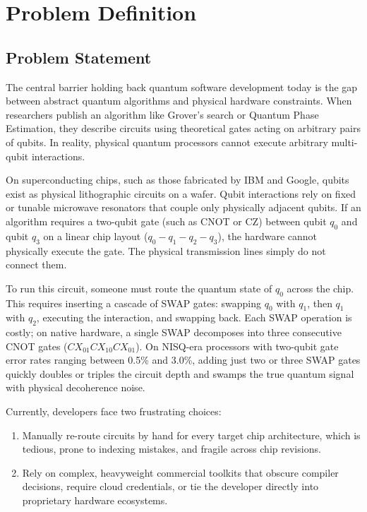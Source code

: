 
\chapter{Problem Definition}


\section{Problem Statement}

The central barrier holding back quantum software development today is the gap between abstract quantum algorithms and physical hardware constraints. When researchers publish an algorithm like Grover's search or Quantum Phase Estimation, they describe circuits using theoretical gates acting on arbitrary pairs of qubits. In reality, physical quantum processors cannot execute arbitrary multi-qubit interactions.

On superconducting chips, such as those fabricated by IBM and Google, qubits exist as physical lithographic circuits on a wafer. Qubit interactions rely on fixed or tunable microwave resonators that couple only physically adjacent qubits. If an algorithm requires a two-qubit gate (such as CNOT or CZ) between qubit $q_0$ and qubit $q_3$ on a linear chip layout ($q_0 - q_1 - q_2 - q_3$), the hardware cannot physically execute the gate. The physical transmission lines simply do not connect them.

To run this circuit, someone must route the quantum state of $q_0$ across the chip. This requires inserting a cascade of SWAP gates: swapping $q_0$ with $q_1$, then $q_1$ with $q_2$, executing the interaction, and swapping back. Each SWAP operation is costly; on native hardware, a single SWAP decomposes into three consecutive CNOT gates ($CX_{01} CX_{10} CX_{01}$). On NISQ-era processors with two-qubit gate error rates ranging between 0.5\% and 3.0\%, adding just two or three SWAP gates quickly doubles or triples the circuit depth and swamps the true quantum signal with physical decoherence noise.

Currently, developers face two frustrating choices:
\begin{enumerate}[leftmargin=*]
    \item Manually re-route circuits by hand for every target chip architecture, which is tedious, prone to indexing mistakes, and fragile across chip revisions.
    \item Rely on complex, heavyweight commercial toolkits that obscure compiler decisions, require cloud credentials, or tie the developer directly into proprietary hardware ecosystems.
\end{enumerate}

